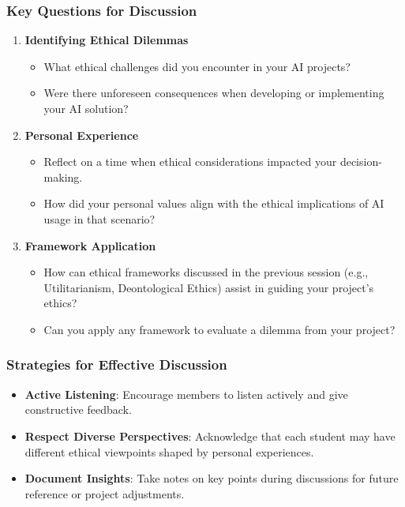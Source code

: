 \documentclass[aspectratio=169]{beamer}
\begin{document}
\begin{frame}[fragile]
    \frametitle{Key Questions for Discussion}
    \begin{enumerate}
        \item \textbf{Identifying Ethical Dilemmas}
        \begin{itemize}
            \item What ethical challenges did you encounter in your AI projects?
            \item Were there unforeseen consequences when developing or implementing your AI solution?
        \end{itemize}
        
        \item \textbf{Personal Experience}
        \begin{itemize}
            \item Reflect on a time when ethical considerations impacted your decision-making.
            \item How did your personal values align with the ethical implications of AI usage in that scenario?
        \end{itemize}
        
        \item \textbf{Framework Application}
        \begin{itemize}
            \item How can ethical frameworks discussed in the previous session (e.g., Utilitarianism, Deontological Ethics) assist in guiding your project's ethics?
            \item Can you apply any framework to evaluate a dilemma from your project?
        \end{itemize}
    \end{enumerate}
\end{frame}

\begin{frame}[fragile]
    \frametitle{Strategies for Effective Discussion}
    \begin{itemize}
        \item \textbf{Active Listening}: Encourage members to listen actively and give constructive feedback.
        \item \textbf{Respect Diverse Perspectives}: Acknowledge that each student may have different ethical viewpoints shaped by personal experiences.
        \item \textbf{Document Insights}: Take notes on key points during discussions for future reference or project adjustments.
    \end{itemize}
\end{frame}
\end{document}
